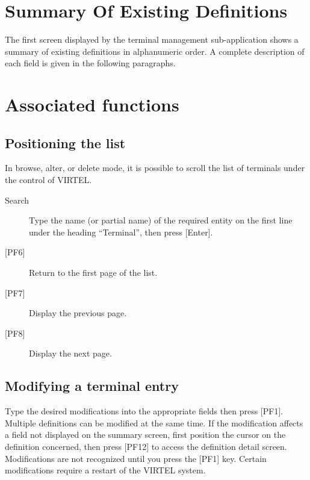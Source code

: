 \documentclass[letterpaper,10pt,english]{sphinxmanual}
\begin{document}
\section{Summary Of Existing Definitions}
\label{\detokenize{connectivity_guide:summary-of-existing-definitions}}
The first screen displayed by the terminal management sub-application shows a summary of existing definitions in alphanumeric order. A complete description of each field is given in the following paragraphs.



\section{Associated functions}
\label{\detokenize{connectivity_guide:associated-functions}}

\subsection{Positioning the list}
\label{\detokenize{connectivity_guide:positioning-the-list}}
In browse, alter, or delete mode, it is possible to scroll the list of terminals under the control of VIRTEL.
\begin{description}
\item[{Search}] \leavevmode
Type the name (or partial name) of the required entity on the first line under the heading “Terminal”, then press {[}Enter{]}.

\item[{{[}PF6{]}}] \leavevmode
Return to the first page of the list.

\item[{{[}PF7{]}}] \leavevmode
Display the previous page.

\item[{{[}PF8{]}}] \leavevmode
Display the next page.

\end{description}


\subsection{Modifying a terminal entry}
\label{\detokenize{connectivity_guide:modifying-a-terminal-entry}}
Type the desired modifications into the appropriate fields then press {[}PF1{]}. Multiple definitions can be modified at the same time. If the modification affects a field not displayed on the summary screen, first position the cursor on the definition concerned, then press {[}PF12{]} to access the definition detail screen. Modifications are not recognized until you press the {[}PF1{]} key. Certain modifications require a restart of the VIRTEL
system.
\end{document}
